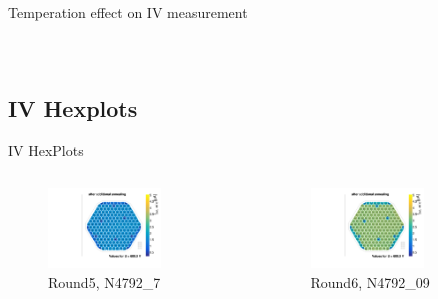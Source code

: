 \documentclass{beamer}
\begin{document}
\begin{frame}{Temperation effect on IV measurement}
\begin{columns}
\begin{figure}
        \end{figure}
    \end{columns}
\end{frame}




\subsection{IV Hexplots}

\begin{frame}{IV HexPlots}
  \begin{columns}
    \begin{figure}
      \includegraphics[width=0.7\textwidth]{plots/N4792_7.pdf}
      \caption{Round5, N4792\_7}
    \end{figure}

    \begin{figure}
      \includegraphics[width=0.7\textwidth]{plots/N4792_09.pdf}
      \caption{Round6, N4792\_09}
    \end{figure}



\end{columns}
\end{frame}
\end{document}
